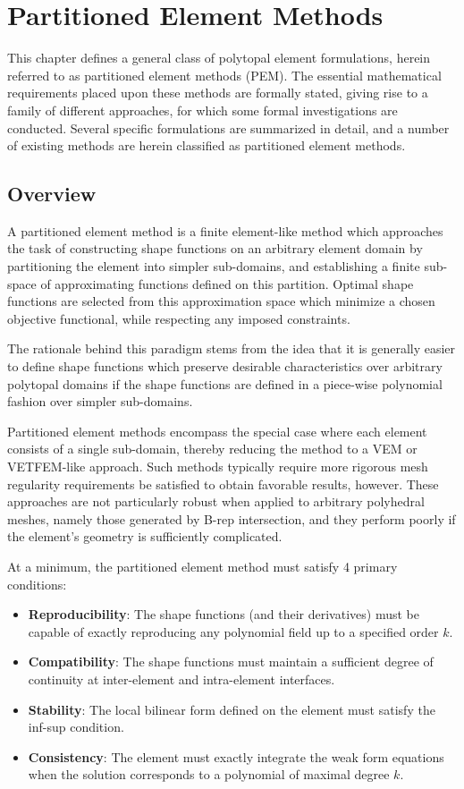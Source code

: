 \chapter{Partitioned Element Methods} \label{ch:pem}
%
This chapter defines a general class of polytopal element formulations, herein referred to as partitioned element methods (PEM). The essential mathematical requirements placed upon these methods are formally stated, giving rise to a family of different approaches, for which some formal investigations are conducted. Several specific formulations are summarized in detail, and a number of existing methods are herein classified as partitioned element methods.

\section{Overview}

A partitioned element method is a finite element-like method which approaches the task of constructing shape functions on an arbitrary element domain by partitioning the element into simpler sub-domains, and establishing a finite sub-space of approximating functions defined on this partition. Optimal shape functions are selected from this approximation space which minimize a chosen objective functional, while respecting any imposed constraints.

The rationale behind this paradigm stems from the idea that it is generally easier to define shape functions which preserve desirable characteristics over arbitrary polytopal domains if the shape functions are defined in a piece-wise polynomial fashion over simpler sub-domains.

Partitioned element methods encompass the special case where each element consists of a single sub-domain, thereby reducing the method to a VEM or VETFEM-like approach. Such methods typically require more rigorous mesh regularity requirements be satisfied to obtain favorable results, however. These approaches are not particularly robust when applied to arbitrary polyhedral meshes, namely those generated by B-rep intersection, and they perform poorly if the element's geometry is sufficiently complicated.

At a minimum, the partitioned element method must satisfy 4 primary conditions:
\begin{itemize}
	\item \textbf{Reproducibility}: The shape functions (and their derivatives) must be capable of exactly reproducing any polynomial field up to a specified order $k$.
	\item \textbf{Compatibility}: The shape functions must maintain a sufficient degree of continuity at inter-element and intra-element interfaces.
	\item \textbf{Stability}: The local bilinear form defined on the element must satisfy the inf-sup condition.
	\item \textbf{Consistency}: The element must exactly integrate the weak form equations when the solution corresponds to a polynomial of maximal degree $k$.
\end{itemize}

